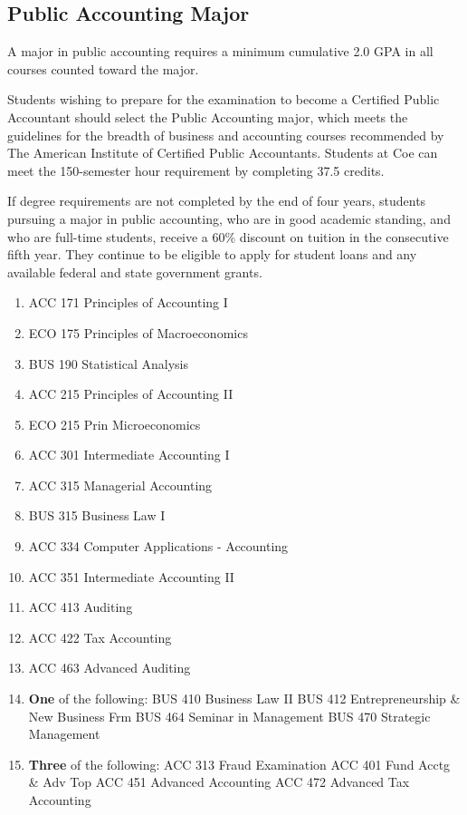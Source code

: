\documentclass[
  letterpaper,
]{scrbook}
\providecommand{\tightlist}{%
  \setlength{\itemsep}{0pt}\setlength{\parskip}{0pt}}
\begin{document}
\subsection{Public Accounting Major}\label{public-accounting-major}

A major in public accounting requires a minimum cumulative 2.0 GPA in
all courses counted toward the major.

Students wishing to prepare for the examination to become a Certified
Public Accountant should select the Public Accounting major, which meets
the guidelines for the breadth of business and accounting courses
recommended by The American Institute of Certified Public Accountants.
Students at Coe can meet the 150-semester hour requirement by completing
37.5 credits.

If degree requirements are not completed by the end of four years,
students pursuing a major in public accounting, who are in good academic
standing, and who are full-time students, receive a 60\% discount on
tuition in the consecutive fifth year. They continue to be eligible to
apply for student loans and any available federal and state government
grants.

\begin{enumerate}
\def\labelenumi{\arabic{enumi}.}
\tightlist
\item
  ACC 171 Principles of Accounting I
\item
  ECO 175 Principles of Macroeconomics
\item
  BUS 190 Statistical Analysis
\item
  ACC 215 Principles of Accounting II
\item
  ECO 215 Prin Microeconomics
\item
  ACC 301 Intermediate Accounting I
\item
  ACC 315 Managerial Accounting
\item
  BUS 315 Business Law I
\item
  ACC 334 Computer Applications - Accounting
\item
  ACC 351 Intermediate Accounting II
\item
  ACC 413 Auditing
\item
  ACC 422 Tax Accounting
\item
  ACC 463 Advanced Auditing
\item
  \textbf{One} of the following: BUS 410 Business Law II BUS 412
  Entrepreneurship \& New Business Frm BUS 464 Seminar in Management BUS
  470 Strategic Management
\item
  \textbf{Three} of the following: ACC 313 Fraud Examination ACC 401
  Fund Acctg \& Adv Top ACC 451 Advanced Accounting ACC 472 Advanced Tax
  Accounting
\end{enumerate}
\end{document}
